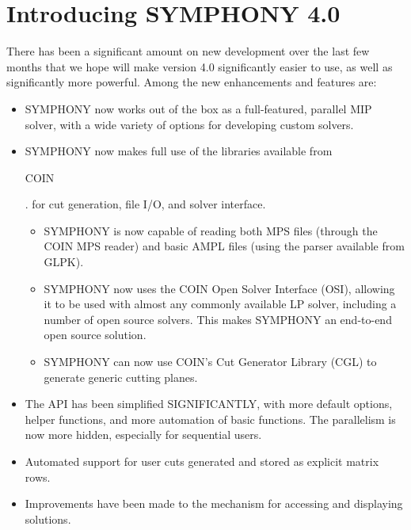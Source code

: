 \section{Introducing SYMPHONY 4.0}
\label{whats-new}

There has been a significant amount on new development over the last few
months that we hope will make version 4.0 significantly easier to use, as well
as significantly more powerful. Among the new enhancements and features are:

\begin{itemize}

\item SYMPHONY now works out of the box as a full-featured, parallel MIP solver,
with a wide variety of options for developing custom solvers.

\item SYMPHONY now makes full use of the libraries available from 
\emph{}
\begin{latexonly} 
COIN
\end{latexonly}.
for cut generation, file I/O, and solver interface.

\begin{itemize}

    \item SYMPHONY is now capable of reading both MPS files (through the COIN MPS
reader) and basic AMPL files (using the parser available from GLPK).

    \item SYMPHONY now uses the COIN Open Solver Interface (OSI), allowing it to
be used with almost any commonly available LP solver, including a number of
open source solvers. This makes SYMPHONY an end-to-end open source solution.

    \item SYMPHONY can now use COIN's Cut Generator Library (CGL) to generate
generic cutting planes.

\end{itemize}

\item The API has been simplified SIGNIFICANTLY, with more default options,
helper functions, and more automation of basic functions. The parallelism is
now more hidden, especially for sequential users.

\item Automated support for user cuts generated and stored as explicit matrix
rows. 

\item Improvements have been made to the mechanism for accessing and displaying
solutions.


\end{itemize}
